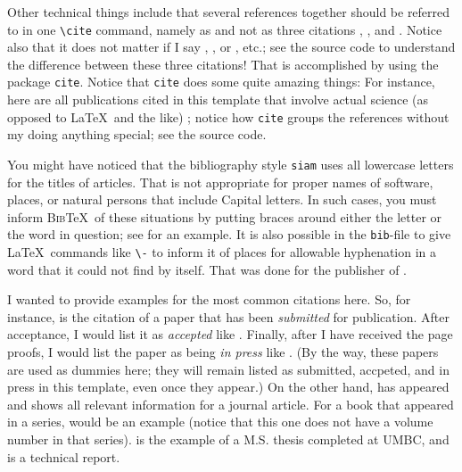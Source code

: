\documentclass[12pt]{article}
\numberwithin{equation}{section}
\numberwithin{table}{section}
\numberwithin{figure}{section}
\begin{document}
Other technical things include that several references together should
be referred to in one \verb+\cite+ command, namely as
\cite{Goossens94,Graetzer1996,Lamport94} and not as three citations
\cite{Goossens94}, \cite{Graetzer1996}, and \cite{Lamport94}.
Notice also that it does not matter if I say
\cite{Goossens94,Graetzer1996,Lamport94},
\cite{Graetzer1996,Goossens94,Lamport94}, or
\cite{Lamport94,Goossens94,Graetzer1996}, etc.;
see the source code to understand the difference between these
three citations!
That is accomplished by using the package \verb+cite+.
Notice that \verb+cite+ does some quite amazing things:
For instance, here are all publications cited in this template
that involve actual science (as opposed to \LaTeX\ and the like)
\cite{Gobbert,GoPr1,GoPr2,Gobbertima2000,Gobbertsiap2000,Ho95,Iserles96,RaimGobbert2010Poisson,Sharmathesis2010};
notice how \verb+cite+ groups the references without my doing
anything special; see the source code.

You might have noticed that the bibliography style \verb+siam+
uses all lowercase letters for the titles of articles.
That is not appropriate for proper names of software, places, or
natural persons that include Capital letters. In such cases,
you must inform \textsc{Bib}\TeX\ of these situations by putting
braces around either the letter or the word in question; see
\cite{Gobbertsiap2000} for an example.
It is also possible in the \verb+bib+-file to give \LaTeX\ commands like
\verb+\-+ to inform it of places for allowable hyphenation in a word that
it could not find by itself. That was done for the publisher of
\cite{Graetzer1996}.

I wanted to provide examples for the most common citations here.
So, for instance, \cite{Gobbertsiap2000} is the citation of a paper that
has been \emph{submitted} for publication. After acceptance, I would list
it as \emph{accepted} like \cite{Gobbertima2000}.
Finally, after I have received the page
proofs, I would list the paper as being \emph{in press} like \cite{GoPr2}.
(By the way, these papers are used as dummies here; they will remain
listed as submitted, accpeted, and in press in this template,
even once they appear.) On the other
hand, \cite{GoPr1} has appeared and shows all relevant information for
a journal article. For a book that appeared in a series,
\cite{Iserles96} would be an example (notice that this
one does not have a volume number in that series).
\cite{Sharmathesis2010} is the example of a M.S. thesis completed at UMBC,
and \cite{RaimGobbert2010Poisson} is a technical report.
\end{document}
